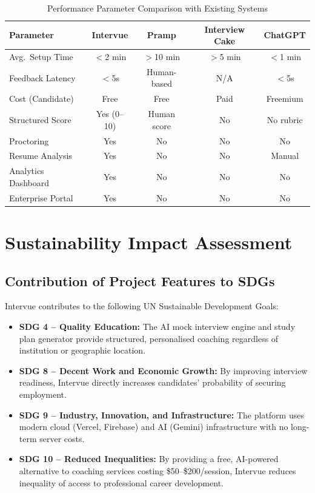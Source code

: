 \documentclass{fisatprojectfinal}
\begin{document}
\begin{table}[h!]
\centering
\caption{Performance Parameter Comparison with Existing Systems}
\begin{tabular}{|p{3.5cm}|c|c|c|c|}
\hline
\textbf{Parameter} & \textbf{Intervue} & \textbf{Pramp} & \textbf{Interview Cake}
  & \textbf{ChatGPT} \\
\hline
Avg.\ Setup Time    & $<$2 min    & $>$10 min   & $>$5 min  & $<$1 min \\
\hline
Feedback Latency    & $<$5s       & Human-based & N/A       & $<$5s \\
\hline
Cost (Candidate)    & Free        & Free        & Paid      & Freemium \\
\hline
Structured Score    & Yes (0--10) & Human score & No        & No rubric \\
\hline
Proctoring          & Yes         & No          & No        & No \\
\hline
Resume Analysis     & Yes         & No          & No        & Manual \\
\hline
Analytics Dashboard & Yes         & No          & No        & No \\
\hline
Enterprise Portal   & Yes         & No          & No        & No \\
\hline
\end{tabular}
\end{table}

\section{Sustainability Impact Assessment}

\subsection{Contribution of Project Features to SDGs}
Intervue contributes to the following UN Sustainable Development Goals:
\begin{itemize}
  \item \textbf{SDG 4 -- Quality Education:} The AI mock interview engine and study plan
        generator provide structured, personalised coaching regardless of institution or
        geographic location.
  \item \textbf{SDG 8 -- Decent Work and Economic Growth:} By improving interview
        readiness, Intervue directly increases candidates' probability of securing
        employment.
  \item \textbf{SDG 9 -- Industry, Innovation, and Infrastructure:} The platform uses
        modern cloud (Vercel, Firebase) and AI (Gemini) infrastructure with no long-term
        server costs.
  \item \textbf{SDG 10 -- Reduced Inequalities:} By providing a free, AI-powered
        alternative to coaching services costing \$50--\$200/session, Intervue reduces
        inequality of access to professional career development.
\end{itemize}
\end{document}
